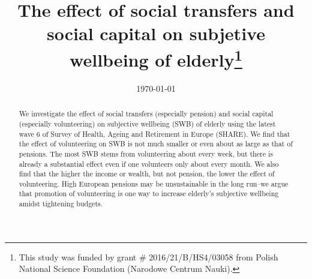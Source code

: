 \documentclass[10pt, letterpaper]{article}
\date{{}\today}
\title{  
The effect of social transfers and social capital on subjetive wellbeing of
elderly\footnote{This study was funded by grant \# 2016/21/B/HS4/03058 from
  Polish National Science Foundation (Narodowe Centrum Nauki).}
}
\author{
}
\begin{document}


\maketitle
\vspace{-.4in}
\begin{center}

\end{center}


\begin{abstract}
\noindent We investigate the effect of social transfers (especially pension) and
social capital (especially volunteering) on subjective wellbeing (SWB) of
elderly using the latest wave 6 of Survey of Health, Ageing and Retirement in Europe
(SHARE). We find that the effect of volunteering on SWB is not much smaller or
even about as large as that of pensions. The most SWB stems from volunteering about
every week, but there is already a substantial effect even if one volunteers only
about every month. 
We also find that the higher the income or wealth, but not pension, the lower
the effect of volunteering.  
High European pensions may be unsustainable in the long run--we argue that
 promotion of volunteering is one way to increase elderly's subjective wellbeing amidst tightening budgets.
\end{abstract}
\vspace{.15in} 
\vspace{.25in} 
\end{document}
